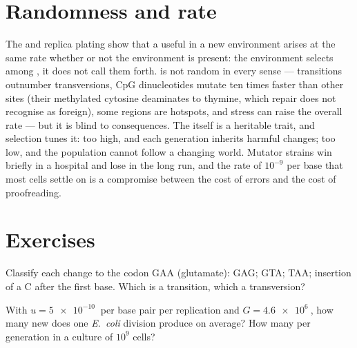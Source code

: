 \section{Randomness and rate}

\begin{proposition}\label{prop:b2:genome-diversification:random}
The  and replica plating show that a 
useful in a new environment arises at the same rate whether or not
the environment is present: the environment selects among
, it does not call them forth.  is not random in
every sense --- transitions outnumber transversions, CpG
dinucleotides mutate ten times faster than other sites (their
methylated cytosine deaminates to thymine, which repair does not
recognise as foreign), some regions are hotspots, and stress can
raise the overall rate --- but it is blind to consequences. The
 itself is a heritable trait, and selection tunes it:
too high, and each generation inherits harmful changes; too low,
and the population cannot follow a changing world. Mutator strains
win briefly in a hospital and lose in the long run, and the rate of
$10^{-9}$ per base that most cells settle on is a compromise between
the cost of errors and the cost of proofreading.
\end{proposition}

\section{Exercises}

\begin{exercise}[$\star$]\label{exo:b2:genome-diversification:1}
Classify each change to the codon GAA (glutamate): GAG; GTA; TAA;
insertion of a C after the first base. Which is a transition, which a
transversion?
\end{exercise}

\begin{exercise}[$\star$]\label{exo:b2:genome-diversification:2}
With $u = \qty{5e-10}{}$ per base pair per replication and $G =
\qty{4.6e6}{}$, how many new  does one \emph{E.~coli}
division produce on average? How many per generation in a culture of
$10^{9}$ cells?
\end{exercise}

